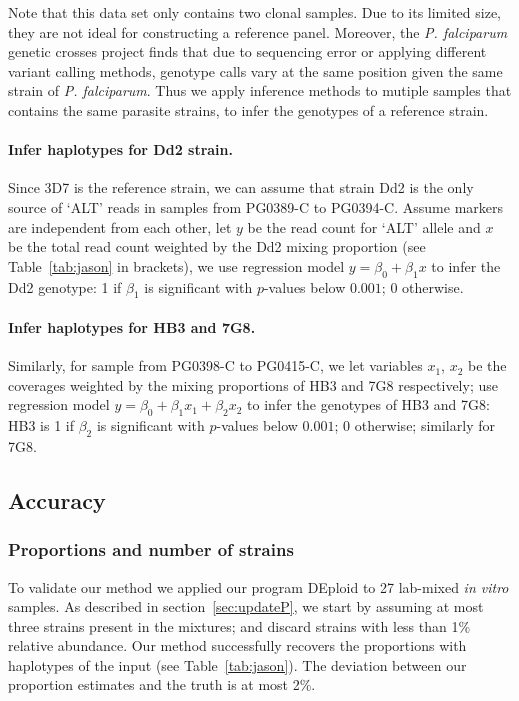 \documentclass{bioinfo}
\begin{document}
Note that this data set only contains two clonal samples. Due to its limited size, they are not ideal for constructing a reference panel. Moreover, the {\em P. falciparum} genetic crosses project \citep{Miles2016} finds that due to sequencing error or applying different variant calling methods, genotype calls vary at the same position given the same strain of {\em P. falciparum}. Thus we apply inference methods to mutiple samples that contains the same parasite strains, to infer the genotypes of a reference strain.

\paragraph{Infer haplotypes for Dd2 strain.}
Since 3D7 is the reference strain, we can assume that strain Dd2 is the only source of `ALT' reads in samples from {\textmd PG0389-C} to {\textmd PG0394-C}. Assume markers are independent from each other, let $y$ be the read count for `ALT' allele and $x$ be the total read count weighted by the Dd2 mixing proportion (see Table~\ref{tab:jason} in brackets), we use regression model $y = \beta_0 + \beta_{1} x$ to infer the Dd2 genotype: 1 if $\beta_{1}$ is significant with $p$-values below $0.001$; 0 otherwise.

\paragraph{Infer haplotypes for HB3 and 7G8.}
Similarly, for sample from {\textmd PG0398-C} to {\textmd PG0415-C}, we let variables $x_1$, $x_2$ be the coverages weighted by the mixing proportions of HB3 and 7G8 respectively; use regression model $y = \beta_0 + \beta_{1} x_1 + \beta_{2} x_2$ to infer the genotypes of HB3 and 7G8: HB3 is 1 if $\beta_{2}$ is significant with $p$-values below $0.001$; 0 otherwise; similarly for 7G8.

\subsection{Accuracy}
\subsubsection{Proportions and number of strains}
To validate our method we applied our program {\textmd DEploid} to 27 lab-mixed {\em in vitro} samples. As described in section~\ref{sec:updateP}, we start by assuming at most three strains present in the mixtures; and discard strains with less than 1\% relative abundance. Our method successfully recovers the proportions with haplotypes of the input (see Table~\ref{tab:jason}). The deviation between our proportion estimates and the truth is at most 2\%.
\end{document}
